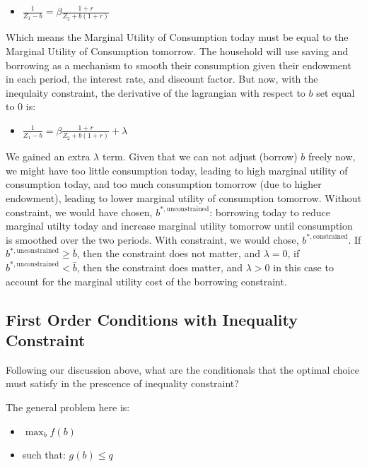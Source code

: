 \documentclass[
]{book}
\providecommand{\tightlist}{%
  \setlength{\itemsep}{0pt}\setlength{\parskip}{0pt}}
\begin{document}
\begin{itemize}
\tightlist
\item
  \(\displaystyle \frac{1}{Z_1 -b}=\beta \frac{1+r}{Z_2 +b(1+r)}\)
\end{itemize}

Which means the Marginal Utility of Consumption today must be equal to
the Marginal Utility of Consumption tomorrow. The household will use
saving and borrowing as a mechanism to smooth their consumption given
their endowment in each period, the interest rate, and discount factor.
But now, with the inequlaity constraint, the derivative of the
lagrangian with respect to \(b\) set equal to \(0\) is:

\begin{itemize}
\tightlist
\item
  \(\displaystyle \frac{1}{Z_1 -b}=\beta \frac{1+r}{Z_2 +b(1+r)}+\lambda\)
\end{itemize}

We gained an extra \(\lambda\) term. Given that we can not adjust (borrow)
\(b\) freely now, we might have too little consumption today, leading to
high marginal utility of consumption today, and too much consumption
tomorrow (due to higher endowment), leading to lower marginal utility of
consumption tomorrow. Without constraint, we would have chosen,
\(b^{*,\textrm{unconstrained}}\): borrowing today to reduce marginal
utilty today and increase marginal utility tomorrow until consumption is
smoothed over the two periods. With constraint, we would chose,
\(b^{*,\textrm{constrained}}\). If
\(b^{*,\textrm{unconstrained}} \ge \bar{b}\), then the constraint does not
matter, and \(\lambda =0\), if \(b^{*,\textrm{unconstrained}} <\bar{b}\),
then the constraint does matter, and \(\lambda >0\) in this case to
account for the marginal utility cost of the borrowing constraint.

\hypertarget{first-order-conditions-with-inequality-constraint}{%
\subsection{First Order Conditions with Inequality Constraint}\label{first-order-conditions-with-inequality-constraint}}

Following our discussion above, what are the conditionals that the
optimal choice must satisfy in the prescence of inequality constraint?

The general problem here is:

\begin{itemize}
\item
  \(\displaystyle \max_b f(b)\)
\item
  such that: \(g(b)\le q\)
\end{itemize}
\end{document}
